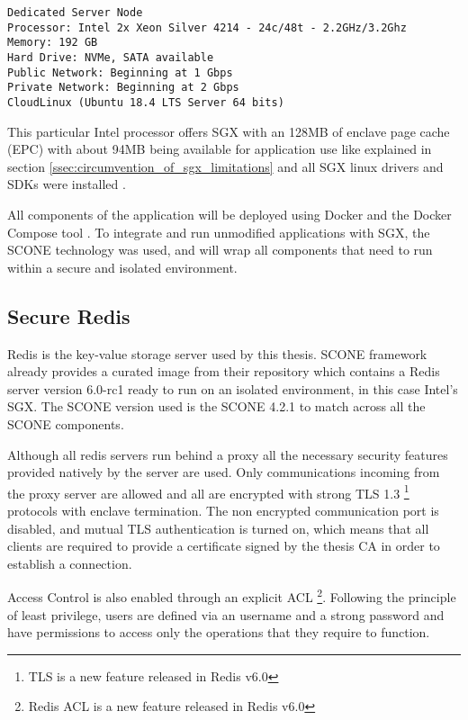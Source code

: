 \lstset{numbers=none, caption=Machine Specifications, label=lst:machine_specs}
\label{lst:ovh_machine_specs}
\begin{lstlisting}
Dedicated Server Node
Processor: Intel 2x Xeon Silver 4214 - 24c/48t - 2.2GHz/3.2Ghz
Memory: 192 GB
Hard Drive: NVMe, SATA available
Public Network: Beginning at 1 Gbps
Private Network: Beginning at 2 Gbps
CloudLinux (Ubuntu 18.4 LTS Server 64 bits)
\end{lstlisting}

This particular Intel processor offers \gls{SGX} with an 128\gls{MB} of enclave page cache (\gls{EPC}) with about 94\gls{MB} being available for application use like explained in section \ref{ssec:circumvention_of_sgx_limitations} and all \gls{SGX} linux drivers and \glspl{SDK} were installed \cite{sgx_drivers:1, sgx_sdk:1}.

All components of the application will be deployed using Docker \cite{docker:1} and the Docker Compose tool \cite{docker-compose:1}. To integrate and run unmodified applications with \gls{SGX}, the SCONE \cite{scone:1} technology was used, and will wrap all components that need to run within a secure and isolated environment.

\subsection{Secure Redis}
\label{ssec:secure_redis}

Redis \cite{redis:1} is the key-value storage server used by this thesis. SCONE framework already provides a curated image from their repository which contains a Redis server version 6.0-rc1 ready to run on an isolated environment, in this case Intel's SGX. The SCONE version used is the SCONE 4.2.1 to match across all the SCONE components.

Although all redis servers run behind a proxy all the necessary security features provided natively by the server are used. Only communications incoming from the proxy server are allowed and all are encrypted with strong \gls{TLS} 1.3 \footnote{TLS is a new feature released in Redis v6.0} protocols with enclave termination. The non encrypted communication port is disabled, and mutual \gls{TLS} authentication is turned on, which means that all clients are required to provide a certificate signed by the thesis CA in order to establish a connection.

Access Control is also enabled through an explicit \gls{ACL} \footnote{Redis ACL is a new feature released in Redis v6.0}. Following the principle of least privilege, users are defined via an username and a strong password and have permissions to access only the operations that they require to function.

